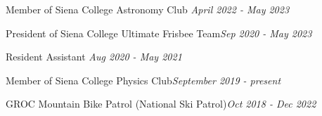 \documentclass[a4paper, 12pt]{article}
\begin{document}
Member of Siena College Astronomy Club \hfill \textit{April 2022 - May 2023} 

President of Siena College Ultimate Frisbee Team\hfill \textit{Sep 2020 - May 2023} 

Resident Assistant \hfill \textit{Aug 2020 - May 2021}  

Member of Siena College Physics Club\hfill \textit{September 2019 - present}

GROC Mountain Bike Patrol (National Ski Patrol)\hfill \textit{Oct 2018 - Dec 2022} 
\end{document}
